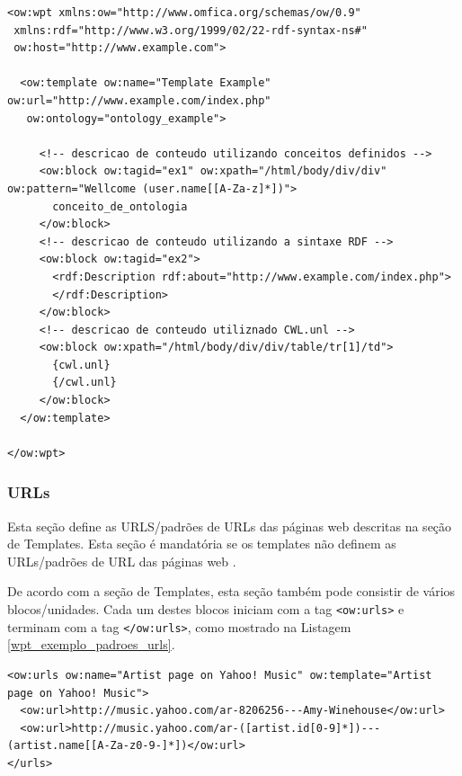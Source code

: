 \pagebreak
{}
\begin{lstlisting}[label=wpt_descricao_conteudo]
<ow:wpt xmlns:ow="http://www.omfica.org/schemas/ow/0.9"
 xmlns:rdf="http://www.w3.org/1999/02/22-rdf-syntax-ns#"
 ow:host="http://www.example.com">

  <ow:template ow:name="Template Example" ow:url="http://www.example.com/index.php"
   ow:ontology="ontology_example">

     <!-- descricao de conteudo utilizando conceitos definidos -->
     <ow:block ow:tagid="ex1" ow:xpath="/html/body/div/div" ow:pattern="Wellcome (user.name[[A-Za-z]*])">
       conceito_de_ontologia
     </ow:block>
     <!-- descricao de conteudo utilizando a sintaxe RDF -->
     <ow:block ow:tagid="ex2">
       <rdf:Description rdf:about="http://www.example.com/index.php">
       </rdf:Description>
     </ow:block>
     <!-- descricao de conteudo utiliznado CWL.unl -->
     <ow:block ow:xpath="/html/body/div/div/table/tr[1]/td">
       {cwl.unl}
       {/cwl.unl}
     </ow:block>
  </ow:template>

</ow:wpt>
\end{lstlisting}

\subsubsection{URLs}

Esta seção define as URLS/padrões de URLs das páginas web descritas na seção de Templates. Esta seção é mandatória se os templates não definem as URLs/padrões de URL das páginas web \cite{wpt}.

De acordo com a seção de Templates, esta seção também pode consistir de vários blocos/unidades. Cada um destes blocos iniciam com a tag \texttt{<ow:urls>} e terminam com a tag \texttt{</ow:urls>}, como mostrado na Listagem \ref{wpt_exemplo_padroes_urls}.


\begin{lstlisting}[label=wpt_exemplo_padroes_urls]
<ow:urls ow:name="Artist page on Yahoo! Music" ow:template="Artist page on Yahoo! Music">
  <ow:url>http://music.yahoo.com/ar-8206256---Amy-Winehouse</ow:url>
  <ow:url>http://music.yahoo.com/ar-([artist.id[0-9]*])---(artist.name[[A-Za-z0-9-]*])</ow:url>
</urls>
\end{lstlisting}

